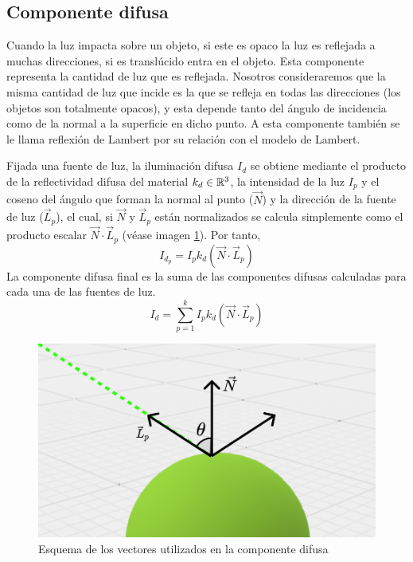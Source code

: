 \subsection{Componente difusa}

Cuando la luz impacta sobre un objeto, si este es opaco la luz es reflejada a muchas direcciones, si es translúcido entra en el objeto. Esta componente representa la cantidad de luz que es reflejada. Nosotros consideraremos que la misma cantidad de luz que incide es la que se refleja en todas las direcciones (los objetos son totalmente opacos), y esta depende tanto del ángulo de incidencia como de la normal a la superficie en dicho punto. A esta componente también se le llama reflexión de Lambert por su relación con el modelo de Lambert.

Fijada una fuente de luz, la iluminación difusa $I_d$ se obtiene mediante el producto de la reflectividad difusa del material $k_d\in\mathbb{R}^3$, la intensidad de la luz $I_p$ y el coseno del ángulo que forman la normal al punto ($\vec N$) y la dirección de la fuente de luz ($\vec L_p$), el cual, si $\vec N$ y $\vec L_p$ están normalizados se calcula simplemente como el producto escalar $\vec N\cdot \vec L_p$ (véase imagen \ref{fig:difusa}). Por tanto,
\begin{equation}
    I_{d_p} = I_p k_d (\vec N\cdot \vec L_p)
\end{equation}
La componente difusa final es la suma de las componentes difusas calculadas para cada una de las fuentes de luz.
\begin{equation}
    I_d = \sum_{p=1}^k I_p k_d (\vec N\cdot \vec L_p)
\end{equation}

\begin{figure} [ht]
    \centering
    \includegraphics[scale = 0.25]{img/C8/difusa.png}
    \caption{Esquema de los vectores utilizados en la componente difusa}
    \label{fig:difusa}
\end{figure}

